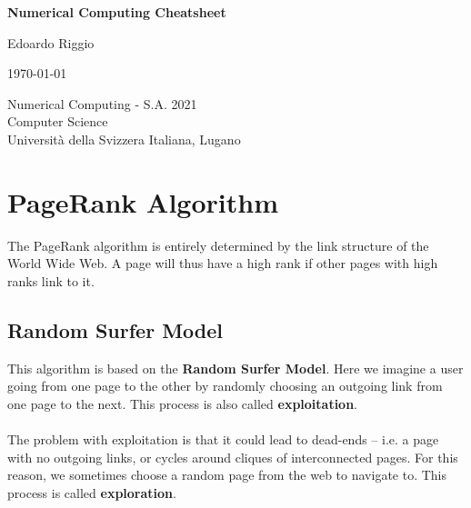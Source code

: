 \documentclass{article}
\begin{document}
\begin{titlepage}
    \begin{center}
        \vspace*{1cm}
        
        \Huge
        \textbf{Numerical Computing Cheatsheet}
        
        \vspace{0.5cm}
        \LARGE
        
        \vspace{.5cm}
        
        Edoardo Riggio
   		  \vspace{1.5cm}
       
        \vfill
        
        \today
        
        \vspace{.8cm}
          \Large
          Numerical Computing - S.A. 2021 \\
        Computer Science\\
        Universit\`{a} della Svizzera Italiana, Lugano\\
        
    \end{center}
\end{titlepage}

\tableofcontents

\newpage

\section{PageRank Algorithm}
The PageRank algorithm is entirely determined by the link structure of the World Wide Web. A page will thus have a high rank if other pages with high ranks link to it.

\subsection{Random Surfer Model}
This algorithm is based on the \textbf{Random Surfer Model}. Here we imagine a user going from one page to the other by randomly choosing an outgoing link from one page to the next. This process is also called \textbf{exploitation}. \\ \\
The problem with exploitation is that it could lead to dead-ends -- i.e. a page with no outgoing links, or cycles around cliques of interconnected pages. For this reason, we sometimes choose a random page from the web to navigate to. This process is called \textbf{exploration}.
\end{document}
